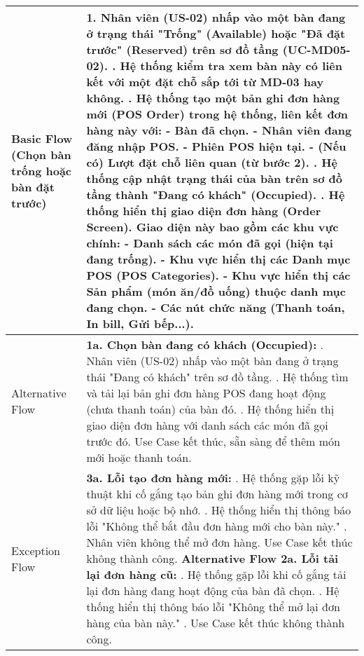 \begin{longtable}{|m{4cm}|p{11cm}|}
Basic Flow (Chọn bàn trống hoặc bàn đặt trước) & 1. Nhân viên (US-02) nhấp vào một bàn đang ở trạng thái "Trống" (Available) hoặc "Đã đặt trước" (Reserved) trên sơ đồ tầng (UC-MD05-02). \newline 2. Hệ thống kiểm tra xem bàn này có liên kết với một đặt chỗ sắp tới từ MD-03 hay không. \newline 3. Hệ thống tạo một bản ghi đơn hàng mới (POS Order) trong hệ thống, liên kết đơn hàng này với: \newline    - Bàn đã chọn. \newline    - Nhân viên đang đăng nhập POS. \newline    - Phiên POS hiện tại. \newline    - (Nếu có) Lượt đặt chỗ liên quan (từ bước 2). \newline 4. Hệ thống cập nhật trạng thái của bàn trên sơ đồ tầng thành "Đang có khách" (Occupied). \newline 5. Hệ thống hiển thị giao diện đơn hàng (Order Screen). Giao diện này bao gồm các khu vực chính: \newline    - Danh sách các món đã gọi (hiện tại đang trống). \newline    - Khu vực hiển thị các Danh mục POS (POS Categories). \newline    - Khu vực hiển thị các Sản phẩm (món ăn/đồ uống) thuộc danh mục đang chọn. \newline    - Các nút chức năng (Thanh toán, In bill, Gửi bếp...). \\
\hline
Alternative Flow & \textbf{1a. Chọn bàn đang có khách (Occupied):} \newline    1. Nhân viên (US-02) nhấp vào một bàn đang ở trạng thái "Đang có khách" trên sơ đồ tầng. \newline    2. Hệ thống tìm và tải lại bản ghi đơn hàng POS đang hoạt động (chưa thanh toán) của bàn đó. \newline    3. Hệ thống hiển thị giao diện đơn hàng với danh sách các món đã gọi trước đó. Use Case kết thúc, sẵn sàng để thêm món mới hoặc thanh toán. \\
\hline
Exception Flow & \textbf{3a. Lỗi tạo đơn hàng mới:} \newline    1. Hệ thống gặp lỗi kỹ thuật khi cố gắng tạo bản ghi đơn hàng mới trong cơ sở dữ liệu hoặc bộ nhớ. \newline    2. Hệ thống hiển thị thông báo lỗi "Không thể bắt đầu đơn hàng mới cho bàn này." \newline    3. Nhân viên không thể mở đơn hàng. Use Case kết thúc không thành công. \newline \textbf{Alternative Flow 2a. Lỗi tải lại đơn hàng cũ:} \newline    1. Hệ thống gặp lỗi khi cố gắng tải lại đơn hàng đang hoạt động của bàn đã chọn. \newline    2. Hệ thống hiển thị thông báo lỗi "Không thể mở lại đơn hàng của bàn này." \newline    3. Use Case kết thúc không thành công. \\

\end{longtable}
